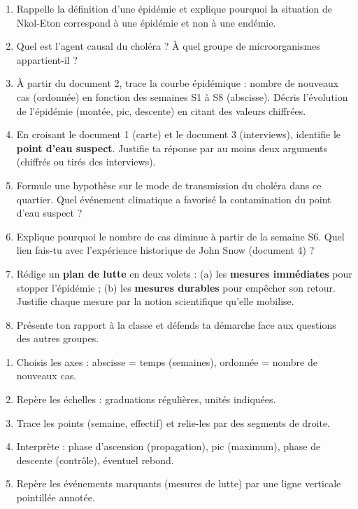 \documentclass[11pt]{article}
\newcommand{\cle}[1]{{\popxbold\color{popdark}#1}}
\begin{document}
\begin{enumerate}
\item Rappelle la définition d'une \cle{épidémie} et explique pourquoi la situation de Nkol-Eton correspond à une épidémie et non à une \cle{endémie}.
\item Quel est l'\cle{agent causal} du choléra ? À quel groupe de microorganismes appartient-il ?
\item À partir du document 2, trace la \cle{courbe épidémique} : nombre de nouveaux cas (ordonnée) en fonction des semaines S1 à S8 (abscisse). Décris l'évolution de l'épidémie (montée, pic, descente) en citant des valeurs chiffrées.
\item En croisant le document 1 (carte) et le document 3 (interviews), identifie le \textbf{point d'eau suspect}. Justifie ta réponse par au moins deux arguments (chiffrés ou tirés des interviews).
\item Formule une \cle{hypothèse} sur le \cle{mode de transmission} du choléra dans ce quartier. Quel événement climatique a favorisé la contamination du point d'eau suspect ?
\item Explique pourquoi le nombre de cas diminue à partir de la semaine S6. Quel lien fais-tu avec l'expérience historique de John Snow (document 4) ?
\item Rédige un \textbf{plan de lutte} en deux volets : (a) les \textbf{mesures immédiates} pour stopper l'épidémie ; (b) les \textbf{mesures durables} pour empêcher son retour. Justifie chaque mesure par la notion scientifique qu'elle mobilise.
\item Présente ton rapport à la classe et défends ta démarche face aux questions des autres groupes.
\end{enumerate}

\begin{methode}
\begin{enumerate}
\item Choisis les axes : abscisse = temps (semaines), ordonnée = nombre de nouveaux cas.
\item Repère les échelles : graduations régulières, unités indiquées.
\item Trace les points (semaine, effectif) et relie-les par des segments de droite.
\item Interprète : phase d'ascension (propagation), pic (maximum), phase de descente (contrôle), éventuel rebond.
\item Repère les événements marquants (mesures de lutte) par une ligne verticale pointillée annotée.
\end{enumerate}
\end{methode}
\end{document}
